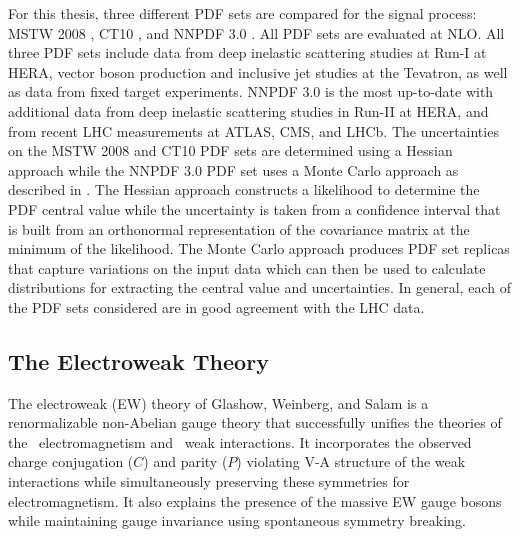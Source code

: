 For this thesis, three different PDF sets are compared for the signal 
process: MSTW 2008 \cite{Martin:2009iq}, CT10 \cite{guzzi:2011sv},  and
NNPDF 3.0 \cite{Ball:2014uwa}. All PDF sets are evaluated at NLO.
All three PDF sets include data from deep inelastic scattering studies
at Run-I at HERA, vector boson production and 
inclusive jet studies at the Tevatron, as well as data from fixed
target experiments.
NNPDF 3.0 is the most up-to-date with additional 
data from deep inelastic scattering
studies in Run-II at HERA, and from recent LHC measurements at ATLAS, CMS, and
LHCb.
The uncertainties on the MSTW 2008 and CT10 PDF sets are 
determined using a Hessian approach while the NNPDF 3.0 PDF set uses
a Monte Carlo approach as described in \cite{Botje:2011sn}.
The Hessian approach constructs a likelihood to determine the PDF central 
value while the uncertainty is taken from a confidence interval
that is built from an orthonormal representation of the covariance matrix
at the minimum of the likelihood.
The Monte Carlo approach produces PDF set replicas
that capture variations on the input data which can then be used
to calculate distributions for extracting the central value and uncertainties.
In general, each of the PDF sets considered are in good agreement with the LHC data.





\subsection{The Electroweak Theory}
\label{sec:theory_ew}
The electroweak (EW) 
theory of Glashow, Weinberg, and 
Salam \cite{glashow:1961tr,Salam:1968rm,weinberg:1967tq}
is a renormalizable \cite{hooft1971renormalization,Hooft1971167}
non-Abelian gauge theory 
that successfully unifies the theories 
of the \uone~electromagnetism and \sutwo~weak interactions.
It incorporates the observed 
charge conjugation ($C$) 
and parity ($P$) violating V-A structure of the weak interactions
\cite{PhysRev.105.1413,Garwin:1957hc,PhysRev.106.1290}
while simultaneously preserving these symmetries for electromagnetism.
It also explains the presence of the massive EW gauge bosons 
while maintaining gauge invariance
using spontaneous symmetry breaking.

